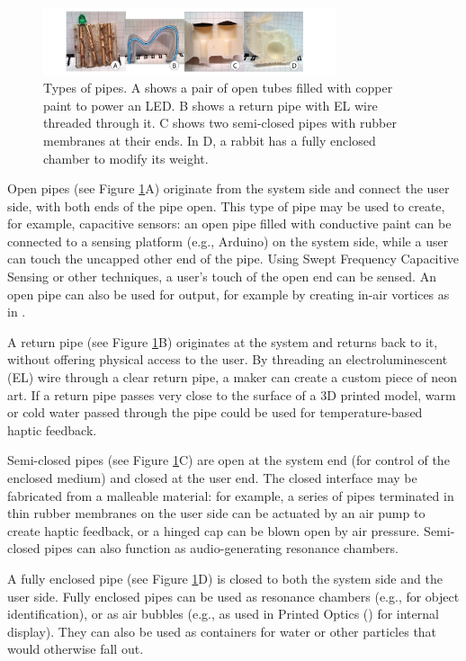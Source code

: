 \begin{figure}[h]
\centering
    \includegraphics[width=3.4in]{figures/types.png}
\caption{Types of pipes.  A shows a pair of open tubes filled with copper paint to power an LED.  B shows a return pipe with EL wire threaded through it.  C shows two semi-closed pipes with rubber membranes at their ends.  In D, a rabbit has a fully enclosed chamber to modify its weight.}
\label{fig:pipespace}
\end{figure}

Open pipes (see Figure \ref{fig:pipespace}A) originate from the system side and connect the user side, with both ends of the pipe open. This type of pipe may be used to create, for example, capacitive sensors: an open pipe filled with conductive paint can be connected to a sensing platform (e.g., Arduino) on the system side, while a user can touch the uncapped other end of the pipe.  Using Swept Frequency Capacitive Sensing \cite{Sato-touche} or other techniques, a user's touch of the open end can be sensed.  An open pipe can also be used for output, for example by creating in-air vortices as in \cite{Sodhi-aireal}.

A return pipe (see Figure \ref{fig:pipespace}B) originates at the system and returns back to it, without offering physical access to the user.  By threading an electroluminescent (EL) wire through a clear return pipe, a maker can create a custom piece of neon art.  If a return pipe passes very close to the surface of a 3D printed model, warm or cold water passed through the pipe could be used for temperature-based haptic feedback.

Semi-closed pipes (see Figure \ref{fig:pipespace}C) are open at the system end (for control of the enclosed medium) and closed at the user end.  The closed interface  may be fabricated from a malleable material: for example, a series of pipes terminated in thin rubber membranes on the user side can be actuated by an air pump to create haptic feedback, or a hinged cap can be blown open by air pressure.  Semi-closed pipes can also function as audio-generating resonance chambers.

A fully enclosed pipe (see Figure \ref{fig:pipespace}D) is closed to both the system side and the user side.  Fully enclosed pipes can be used as resonance chambers (e.g., for object identification), or as air bubbles (e.g., as used in Printed Optics (\cite{Willis-printedoptics}) for internal display).  They can also be used as containers for water or other particles that would otherwise fall out.

